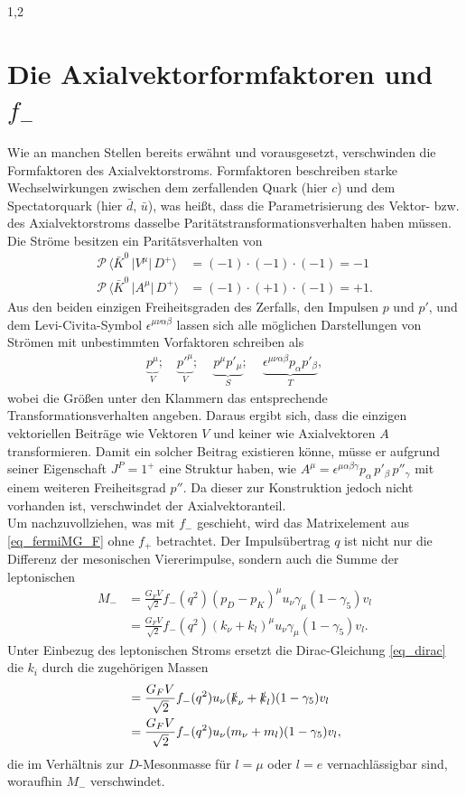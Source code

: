 \documentclass[11pt,a4paper,twoside]{report}
\begin{document}
\begin{spacing}{1,2}
\section{Die Axialvektorformfaktoren und $f_-$}
Wie an manchen Stellen bereits erwähnt und vorausgesetzt, verschwinden die Formfaktoren des Axialvektorstroms. Formfaktoren beschreiben starke 
Wechselwirkungen zwischen dem zerfallenden Quark (hier $c$) und dem Spectatorquark (hier $\bar d$, $\bar u$), was heißt, dass die Parametrisierung des 
Vektor- bzw. des Axialvektorstroms dasselbe Paritätstransformationsverhalten haben müssen. Die Ströme besitzen ein Paritätsverhalten von
\begin{align}
 \mathcal{P} \, \big\langle\bar K^0\,\big|V^\mu|\,D^+\big\rangle &= (-1)\cdot(-1)\cdot(-1) = -1 \nonumber \\
 \mathcal{P} \, \big\langle\bar K^0\,\big|A^\mu|\,D^+\big\rangle &= (-1)\cdot(+1)\cdot(-1) = +1. \nonumber
\end{align}
Aus den beiden einzigen Freiheitsgraden des Zerfalls, den Impulsen $p$ und $p'$, und dem Levi-Civita-Symbol $\epsilon^{\mu\nu\alpha\beta}$ lassen sich alle möglichen
Darstellungen von Strömen mit unbestimmten Vorfaktoren schreiben als
\begin{align}
 \underbrace{p^\mu}_{V} ;\quad \underbrace{p'^\mu}_{V};\quad \,\underbrace{p^\mu p'_\mu }_{S} ; \quad\,\underbrace{\epsilon^{\mu\nu\alpha\beta}p_\alpha p'_\beta}_{T},
\end{align}
wobei die Größen unter den Klammern das entsprechende Transformationsverhalten angeben. Daraus ergibt sich, dass die einzigen vektoriellen Beiträge wie 
Vektoren $V$ und keiner wie Axialvektoren $A$ transformieren. Damit ein solcher Beitrag existieren könne, müsse er aufgrund seiner Eigenschaft $J^P = 1^+$
eine Struktur haben, wie $A^\mu = \epsilon^{\mu\alpha\beta\gamma}p_\alpha\,p'_\beta\,p''_\gamma$ mit einem weiteren Freiheitsgrad $p''$. Da dieser zur 
Konstruktion jedoch nicht vorhanden ist, verschwindet der Axialvektoranteil.\\
\noindent
Um nachzuvollziehen, was mit $f_-$ geschieht, wird das Matrixelement aus \eqref{eq_fermiMG_F} ohne $f_+$ betrachtet. Der Impulsübertrag $q$ ist nicht
nur die Differenz der mesonischen Viererimpulse, sondern auch die Summe der leptonischen
\begin{align}
 M_- &= \frac{G_F V}{\sqrt{2}} f_-(q^2)(p_D-p_K)^\mu u_\nu \gamma_\mu(1-\gamma_5)v_l\nonumber\\
 &= \frac{G_F V}{\sqrt{2}} f_-(q^2)(k_\nu+k_l)^\mu u_\nu \gamma_\mu(1-\gamma_5)v_l.\nonumber
\end{align}
Unter Einbezug des leptonischen Stroms ersetzt die Dirac-Gleichung \eqref{eq_dirac} die $k_i$ durch die zugehörigen Massen
\begin{align}
 &=\frac{G_F V}{\sqrt{2}} f_-(q^2)u_\nu (\slashed{k}_\nu + \slashed{k}_l) (1-\gamma_5)v_l\nonumber\\
 &=\frac{G_F V}{\sqrt{2}} f_-(q^2)u_\nu (m_\nu + m_l) (1-\gamma_5)v_l,\nonumber 
 \end{align}
die im Verhältnis zur $D$-Mesonmasse für $l=\mu$ oder $l=e$ vernachlässigbar sind, woraufhin $M_-$ verschwindet.


\end{spacing}
\end{document}
